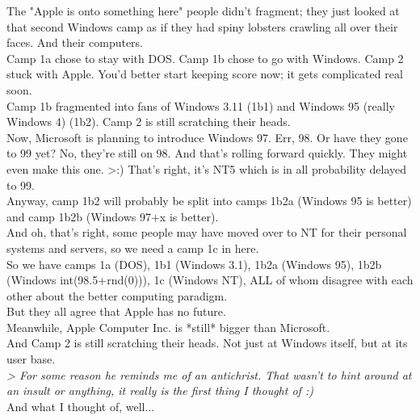 \documentclass[11pt,twoside,a4paper]{article}
\begin{document}
\begin{multicols*}{2}
The "Apple is onto something here" people didn't fragment; they just looked at that second Windows camp as if they had spiny lobsters crawling all over their faces. And their computers.~\\

Camp 1a chose to stay with DOS. Camp 1b chose to go with Windows. Camp 2 stuck with Apple. You'd better start keeping score now; it gets complicated real soon.~\\

Camp 1b fragmented into fans of Windows 3.11 (1b1) and Windows 95 (really Windows 4) (1b2). Camp 2 is still scratching their heads.~\\

Now, Microsoft is planning to introduce Windows 97. Err, 98. Or have they gone to 99 yet? No, they're still on 98. And that's rolling forward quickly. They might even make this one. >:) That's right, it's NT5 which is in all probability delayed to 99.~\\

Anyway, camp 1b2 will probably be split into camps 1b2a (Windows 95 is better) and camp 1b2b (Windows 97+x is better).~\\

And oh, that's right, some people may have moved over to NT for their personal systems and servers, so we need a camp 1c in here.~\\

So we have camps 1a (DOS), 1b1 (Windows 3.1), 1b2a (Windows 95), 1b2b (Windows int(98.5+rnd(0))), 1c (Windows NT), ALL of whom disagree with each other about the better computing paradigm.~\\

But they all agree that Apple has no future.~\\

Meanwhile, Apple Computer Inc. is *still* bigger than Microsoft.~\\

And Camp 2 is still scratching their heads. Not just at Windows itself, but at its user base.~\\

\emph{> For some reason he reminds me of an antichrist. That wasn't to hint around at an insult or anything, it really is the first thing I thought of :)}~\\

And what I thought of, well...~\\

 
		

\end{multicols*}
\end{document}
